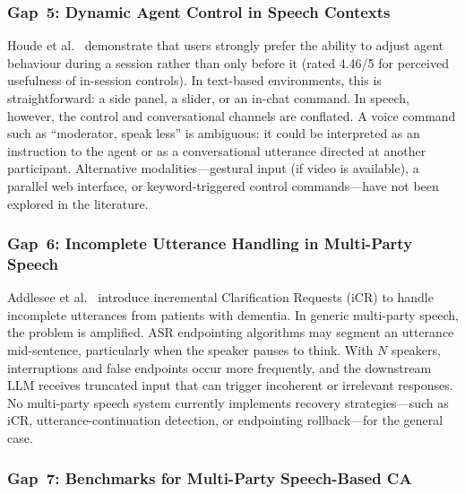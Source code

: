 \subsubsection{Gap~5: Dynamic Agent Control in Speech Contexts}
\label{sssec:gap5}

Houde et al.~\cite{houde2025koala} demonstrate that users strongly prefer the
ability to adjust agent behaviour during a session rather than only before it
(rated 4.46/5 for perceived usefulness of in-session controls).  In text-based
environments, this is straightforward: a side panel, a slider, or an in-chat
command.  In speech, however, the control and conversational channels are
conflated.  A voice command such as ``moderator, speak less'' is ambiguous:
it could be interpreted as an instruction to the agent or as a conversational
utterance directed at another participant.  Alternative modalities---gestural
input (if video is available), a parallel web interface, or keyword-triggered
control commands---have not been explored in the literature.

\subsubsection{Gap~6: Incomplete Utterance Handling in Multi-Party Speech}
\label{sssec:gap6}

Addlesee et al.~\cite{addlesee2024ari} introduce incremental Clarification
Requests (iCR) to handle incomplete utterances from patients with dementia.  In
generic multi-party speech, the problem is amplified.  ASR endpointing
algorithms may segment an utterance mid-sentence, particularly when the
speaker pauses to think.  With $N$ speakers, interruptions and false endpoints
occur more frequently, and the downstream LLM receives truncated input that
can trigger incoherent or irrelevant responses.  No multi-party speech system
currently implements recovery strategies---such as iCR, utterance-continuation
detection, or endpointing rollback---for the general case.

\subsubsection{Gap~7: Benchmarks for Multi-Party Speech-Based CA}
\label{sssec:gap7}

